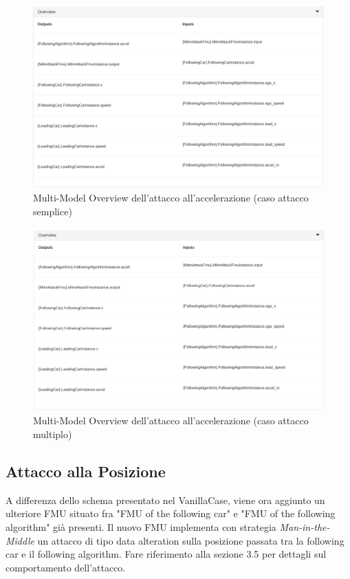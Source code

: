 \begin{figure}[H]
	\centering
	\includegraphics[width=\textwidth]{img/OverviewAccelSingle.png}
	\caption{Multi-Model Overview dell'attacco all'accelerazione (caso attacco semplice)}
\end{figure}
\begin{figure}[H]
	\centering
	\includegraphics[width=\textwidth]{img/OverviewAccelMulti.png}
	\caption{Multi-Model Overview dell'attacco all'accelerazione (caso attacco multiplo)}
\end{figure}

\subsection{Attacco alla Posizione }
A differenza dello schema presentato nel VanillaCase, viene ora aggiunto un ulteriore FMU situato fra "FMU of the following car" e "FMU of the following algorithm" già presenti. Il nuovo FMU implementa con strategia \textit{Man-in-the-Middle} un attacco di tipo data alteration sulla posizione passata tra la following car e il following algorithm. Fare riferimento alla sezione 3.5 per dettagli sul comportamento dell'attacco.

